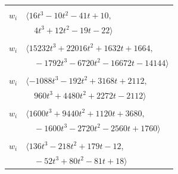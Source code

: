 \documentclass[11pt]{article}
\begin{document}
\begin{longtable}{@{}ll@{}}
\addlinespace[2pt]
\multicolumn{2}{@{}p{0.97\textwidth}@{}}{$i=22$, $D_i=2$, $\rho_{ij}$: $3{:}3, \allowbreak 29{:}3, \allowbreak 30{:}1, \allowbreak 31{:}1, \allowbreak 42{:}1, \allowbreak 45{:}1, \allowbreak 46{:}1, \allowbreak 55{:}3, \allowbreak 56{:}1, \allowbreak 57{:}2$}\\
$w_i$ & $\langle 16t^{3}-10t^{2}-41t+10,$\\
 & $\quad 4t^{3}+12t^{2}-19t-22\rangle$\\
\addlinespace[2pt]
\multicolumn{2}{@{}p{0.97\textwidth}@{}}{$i=23$, $D_i=2$, $e_i=3$, $\rho_{ij}$: $4{:}1, \allowbreak 5{:}3, \allowbreak 8{:}2, \allowbreak 9{:}3, \allowbreak 10{:}1, \allowbreak 15{:}3, \allowbreak 16{:}1, \allowbreak 17{:}2, \allowbreak 28{:}1, \allowbreak 33{:}2, \allowbreak 34{:}2, \allowbreak 35{:}2, \allowbreak 37{:}3, \allowbreak 46{:}3, \allowbreak 53{:}2$}\\
$w_i$ & $\langle 15232t^{3}+22016t^{2}+1632t+1664,$\\
 & $\quad -1792t^{3}-6720t^{2}-16672t-14144\rangle$\\
\addlinespace[2pt]
\multicolumn{2}{@{}p{0.97\textwidth}@{}}{$i=24$, $D_i=4$, $e_i=0$, $\rho_{ij}$: $0{:}3, \allowbreak 4{:}2, \allowbreak 15{:}3, \allowbreak 20{:}2, \allowbreak 21{:}3, \allowbreak 31{:}3, \allowbreak 35{:}2, \allowbreak 38{:}3, \allowbreak 42{:}3, \allowbreak 55{:}3$}\\
$w_i$ & $\langle -1088t^{3}-192t^{2}+3168t+2112,$\\
 & $\quad 960t^{3}+4480t^{2}+2272t-2112\rangle$\\
\addlinespace[2pt]
\multicolumn{2}{@{}p{0.97\textwidth}@{}}{$i=25$, $D_i=2$, $e_i=2$, $\rho_{ij}$: $0{:}2, \allowbreak 10{:}3, \allowbreak 11{:}3, \allowbreak 18{:}3, \allowbreak 20{:}2, \allowbreak 29{:}3, \allowbreak 30{:}3, \allowbreak 32{:}1, \allowbreak 49{:}1, \allowbreak 54{:}1, \allowbreak 56{:}2, \allowbreak 57{:}1$}\\
$w_i$ & $\langle 1600t^{3}+9440t^{2}+1120t+3680,$\\
 & $\quad -1600t^{3}-2720t^{2}-2560t+1760\rangle$\\
\addlinespace[2pt]
\multicolumn{2}{@{}p{0.97\textwidth}@{}}{$i=26$, $D_i=2$, $\rho_{ij}$: $0{:}1, \allowbreak 3{:}2, \allowbreak 5{:}3, \allowbreak 7{:}1, \allowbreak 9{:}1, \allowbreak 10{:}1, \allowbreak 32{:}3, \allowbreak 37{:}1, \allowbreak 46{:}3, \allowbreak 53{:}1, \allowbreak 55{:}2$}\\
$w_i$ & $\langle 136t^{3}-218t^{2}+179t-12,$\\
 & $\quad -52t^{3}+80t^{2}-81t+18\rangle$\\

\end{longtable}
\end{document}
